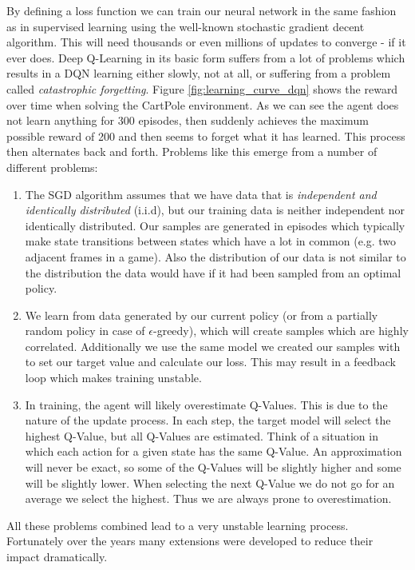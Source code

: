 By defining a loss function we can train our neural network in the same fashion as in supervised learning using the well-known stochastic gradient decent algorithm. This will need thousands or even millions of updates to converge - if it ever does. Deep Q-Learning in its basic form suffers from a lot of problems which results in a DQN learning either slowly, not at all, or suffering from a problem called \textit{catastrophic forgetting}. Figure \ref{fig:learning_curve_dqn} shows the reward over time when solving the CartPole environment. As we can see the agent does not learn anything for 300 episodes, then suddenly achieves the maximum possible reward of 200 and then seems to forget what it has learned. This process then alternates back and forth. Problems like this emerge from a number of different problems:
 \begin{enumerate}
  \item The SGD algorithm assumes that we have data that is \textit{independent and identically distributed} (i.i.d), but our training data is neither independent nor identically distributed. Our samples are generated in episodes which typically make state transitions between states which have a lot in common (e.g. two adjacent frames in a game). Also the distribution of our data is not similar to the distribution the data would have if it had been sampled from an optimal policy. 
  \item We learn from data generated by our current policy (or from a partially random policy in case of $\epsilon$-greedy), which will create samples which are highly correlated. Additionally we use the same model we created our samples with to set our target value and calculate our loss. This may result in a feedback loop which makes training unstable.
  \item In training, the agent will likely overestimate Q-Values. This is due to the nature of the update process. In each step, the target model will select the highest Q-Value, but all Q-Values are estimated. Think of a situation in which each action for a given state has the same Q-Value. An approximation will never be exact, so some of the Q-Values will be slightly higher and some will be slightly lower. When selecting the next Q-Value we do not go for an average we select the highest. Thus we are always prone to overestimation.
 \end{enumerate}

 All these problems combined lead to a very unstable learning process. Fortunately over the years many extensions were developed to reduce their impact dramatically.

